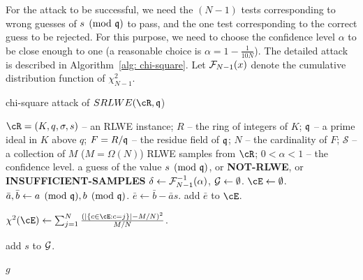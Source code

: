 \documentclass[envcountsame]{llncs}
\begin{document}
For the attack to be successful, we need the $(N-1)$ tests corresponding to wrong guesses of $s \pmod{\mathfrak{q}}$ to pass, and the one test corresponding to the correct guess to be rejected. For this purpose, we need to choose the confidence level $\alpha$ to be close enough to one (a reasonable choice is $\alpha = 1 - \frac{1}{10N}$). The detailed attack is described in Algorithm~\ref{alg: chi-square}.  Let $\mathcal{F}_{N-1}(x)$ denote the cumulative distribution function of $\chi_{N-1}^2$.



\begin{algorithm}
\caption{chi-square attack of $SRLWE(\cR,\fq$)}
 \label{alg: chi-square}        %
\begin{algorithmic} %
    \Require  $\cR = (K,q,\sigma, s)$ -- an RLWE instance; $R$ -- the ring of integers of $K$; $\mathfrak{q}$ -- a prime ideal in $K$ above $q$; $F = R/\mathfrak{q}$ -- the residue field of $\mathfrak{q}$; $N$ -- the cardinality of $F$; $\mathcal{S}$ -- a collection of $M$ ($M = \Omega(N)$) RLWE samples from $\cR$; $0 < \alpha < 1$ -- the confidence level.
    \Ensure a guess of the value $s \pmod{\mathfrak{q}}$, or {\bf NOT-RLWE}, or {\bf INSUFFICIENT-SAMPLES}
    \State $\delta \gets \mathcal{F}_{N-1}^{-1}(\alpha)$, $\mathcal{G} \gets \emptyset$.
        \State $\cE \gets \emptyset$.
            \State $\bar{a}, \bar{b} \gets a \pmod{\mathfrak{q}}, b \pmod{\mathfrak{q}}$.
            \State $\bar{e} \gets \bar{b} - \bar{a}s$.
            \State add $\bar{e}$ to $\cE$.
        \EndFor

        \State     $\chi^2(\cE) \gets \sum_{j = 1}^N \frac{(|\{c \in \cE: c = j\}|  - M/N)^2}{M/N}$.

            \State add $s$ to $\mathcal{G}$.
        \EndIf
    \EndFor


        \Return $g$
    \Else

    \EndIf

\end{algorithmic}
\end{algorithm}
\end{document}
